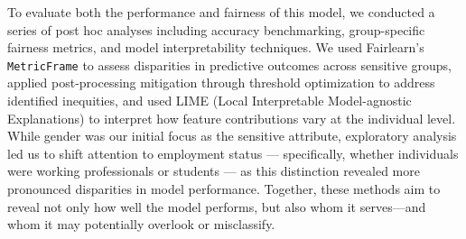 To evaluate both the performance and fairness of this model, we conducted a series of post hoc analyses including accuracy benchmarking, group-specific fairness metrics, and model interpretability techniques. We used Fairlearn’s \texttt{MetricFrame} to assess disparities in predictive outcomes across sensitive groups, applied post-processing mitigation through threshold optimization to address identified inequities, and used LIME (Local Interpretable Model-agnostic Explanations) \parencite{ribeiro2016why} to interpret how feature contributions vary at the individual level. While gender was our initial focus as the sensitive attribute, exploratory analysis led us to shift attention to employment status — specifically, whether individuals were working professionals or students — as this distinction revealed more pronounced disparities in model performance. Together, these methods aim to reveal not only how well the model performs, but also whom it serves—and whom it may potentially overlook or misclassify.
